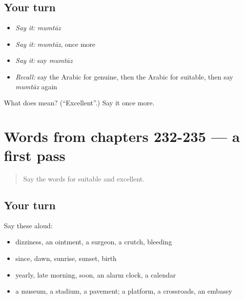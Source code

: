 \subsection*{Your turn}
\begin{itemize}
\raggedright
  \item \emph{Say it:} \emph{mumtāz}
  \item \emph{Say it:} \emph{mumtāz}, once more
  \item \emph{Say it:} say \emph{mumtāz}
  \item \emph{Recall:} say the Arabic for genuine, then the Arabic for suitable, then say \emph{mumtāz} again
\end{itemize}

\begin{tcolorbox}[breakable,colback=teal!4,colframe=teal!35!black,title={Before you move on}]
What does  mean? (\textquotedblleft{}Excellent\textquotedblright{}.) Say it once more.
\end{tcolorbox}
\section[(dialogue)]{Words from chapters 232-235 — a first pass}

\label{lesson:AR-R240-first-pass-words-from-chapters-232-235}



\begin{quote}
Say the words for suitable and excellent.
\end{quote}

\subsection*{Your turn}
Say these aloud:

\begin{itemize}
\raggedright
  \item dizziness, an ointment, a surgeon, a crutch, bleeding
  \item since, dawn, sunrise, sunset, birth
  \item yearly, late morning, soon, an alarm clock, a calendar
  \item a museum, a stadium, a pavement; a platform, a crossroads, an embassy
\end{itemize}

